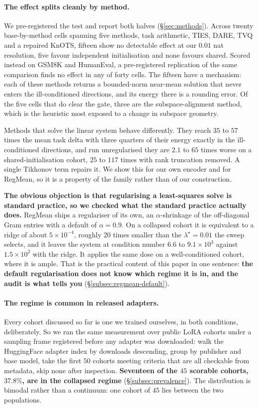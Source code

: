 \paragraph{The effect splits cleanly by method.} We pre-registered the test
and report both halves (\S\ref{sec:methods}). Across twenty
base-by-method cells spanning five methods, task arithmetic, TIES, DARE,
TVQ and a repaired KnOTS, fifteen show no detectable effect at our $0.01$
nat resolution, five favour independent initialisation and none favours
shared. Scored instead on GSM8K and HumanEval, a pre-registered replication
of the same comparison finds no effect in any of forty cells. The fifteen
have a mechanism: each of these methods returns a bounded-norm near-mean
solution that never enters the ill-conditioned directions, and its energy
there is a rounding error. Of the five cells
that do clear the gate, three are the subspace-alignment method, which is
the heuristic most exposed to a change in subspace geometry.

Methods that solve the linear system behave differently. They reach $35$ to
$57$ times the mean task delta with three quarters of their energy exactly
in the ill-conditioned directions, and run unregularised they are $2.1$ to
$65$ times worse on a shared-initialisation cohort, $25$ to $117$ times
with rank truncation removed. A single Tikhonov term repairs it. We show
this for our own encoder and for RegMean, so it is a property of the
family rather than of our construction.

\textbf{The obvious objection is that regularising a least-squares solve is
standard practice, so we checked what the standard practice actually does.}
RegMean ships a regulariser of its own, an $\alpha$-shrinkage of the
off-diagonal Gram entries with a default of $\alpha = 0.9$. On a collapsed
cohort it is equivalent to a ridge of about $5\times10^{-4}$, roughly $20$
times smaller than the $\lambda^\star = 0.01$ the sweep selects, and it leaves
the system at condition number $6.6$ to $9.1\times10^{3}$ against
$1.5\times10^{2}$ with the ridge. It applies the same dose on a
well-conditioned cohort, where it is ample. That is the practical content of
this paper in one sentence: \textbf{the default regularisation does not know
which regime it is in, and the audit is what tells you}
(\S\ref{subsec:regmean-default}).

\paragraph{The regime is common in released adapters.} Every cohort
discussed so far is one we trained ourselves, in both conditions,
deliberately. So we ran the same measurement over public LoRA cohorts under
a sampling frame registered before any adapter was downloaded: walk the
HuggingFace adapter index by downloads descending, group by publisher and
base model, take the first $50$ cohorts meeting criteria that are all
checkable from metadata, skip none after inspection. \textbf{Seventeen of
the $45$ scorable cohorts, $37.8\%$, are in the collapsed regime}
(\S\ref{subsec:prevalence}). The distribution is bimodal rather than a
continuum: one cohort of $45$ lies between the two populations.

